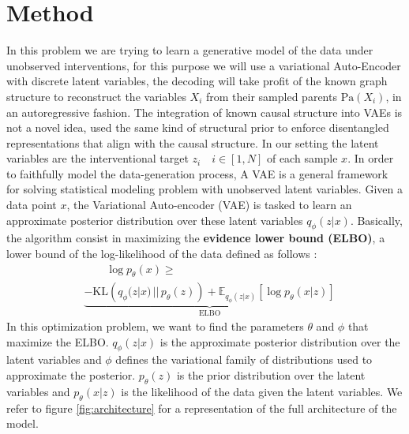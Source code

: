 \documentclass{article}
\begin{document}
\section{Method}\label{subsec:Method}
In this problem we are trying to learn a generative model of the data under
unobserved interventions, for this purpose we will use a variational
Auto-Encoder \citep{kingma2022autoencodingvariationalbayes} with discrete
latent variables, the decoding will take profit of the known graph structure to
reconstruct the variables $X_i$ from their sampled parents $\text{Pa}(X_i)$, in
an autoregressive fashion. The integration of known causal structure into VAEs
is not a novel idea, \citet{SCMVAE} used the same kind of structural prior to
enforce disentangled representations that align with the causal structure. In
our setting the latent variables are the interventional target $z_i \quad i \in
    [1,N]$ of each sample $x$. In order to faithfully model the data-generation
process, A VAE is a general framework for solving statistical modeling problem
with unobserved latent variables. Given a data point $x$, the Variational
Auto-encoder (VAE) is tasked to learn an approximate posterior distribution
over these latent variables $q_\phi(z | x)$. Basically, the algorithm consist
in maximizing the \textbf{evidence lower bound (ELBO)}, a lower bound of the
log-likelihood of the data defined as follows :
\begin{align*}
     & \quad\quad \log p_\theta(x) \geq                                                                                                                     \\
     & \underbrace{ - \text{KL}\left(q_\phi(z | x) \,||\, p_\theta(z)\right)+ \mathbb{E}_{q_\phi(z | x)} \left[ \log p_\theta(x | z) \right]}_{\text{ELBO}}
\end{align*}
In this optimization problem, we want to find the parameters $\theta$ and $\phi$ that maximize the ELBO. $q_\phi(z | x)$ is the approximate posterior distribution over the latent variables and $\phi$ defines the variational family of distributions used to approximate the posterior. $p_\theta(z)$ is the prior distribution over the latent variables and $p_\theta(x | z)$ is the likelihood of the data given the latent variables. We refer to figure \ref{fig:architecture} for a representation of the full architecture of the model.
\end{document}
